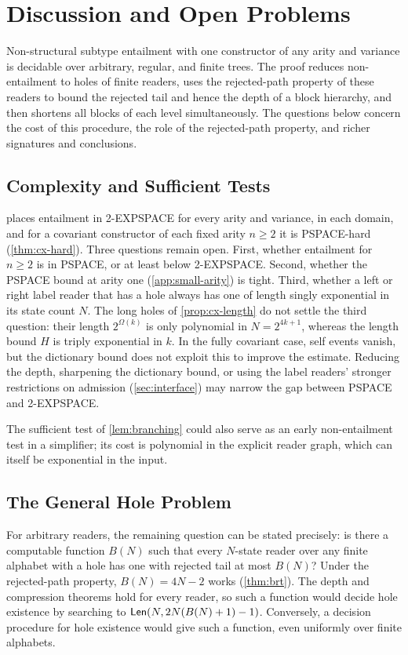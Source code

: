 \section{Discussion and Open Problems}
\label{sec:future}

Non-structural subtype entailment with one constructor of any arity and
variance is decidable over arbitrary, regular, and finite trees. The proof
reduces non-entailment to holes of finite readers, uses the rejected-path
property of these readers to bound the rejected tail and hence the depth of
a block hierarchy, and then shortens all blocks of each level
simultaneously. The questions below concern the cost of this procedure, the
role of the rejected-path property, and richer signatures and conclusions.

\subsection{Complexity and Sufficient Tests}
 places entailment in 2-EXPSPACE for every arity and
variance, in each domain, and for a covariant constructor of each fixed arity
$n\ge2$ it is PSPACE-hard (\cref{thm:cx-hard}). Three questions remain open.
First, whether entailment for $n\ge2$ is in PSPACE, or at least below
2-EXPSPACE. Second, whether the PSPACE bound at arity one
(\cref{app:small-arity}) is tight. Third, whether a left or right label
reader that has a hole always has one of length singly exponential in its
state count $N$. The long holes of \cref{prop:cx-length} do not settle the
third question: their length $2^{\Omega(k)}$ is only polynomial in
$N=2^{4k+1}$, whereas the length bound $H$ is triply exponential in $k$.
In the fully covariant case, self events vanish, but the dictionary bound
does not exploit this to improve the estimate. Reducing the depth,
sharpening the dictionary bound, or using the label readers' stronger
restrictions on admission (\cref{sec:interface}) may narrow the gap between
PSPACE and 2-EXPSPACE.

The sufficient test of \cref{lem:branching} could also serve as an early
non-entailment test in a simplifier; its cost is polynomial in the explicit
reader graph, which can itself be exponential in the input.

\subsection{The General Hole Problem}\label{sec:general-holes}
For arbitrary readers, the remaining question can be stated precisely:
is there a computable function $B(N)$ such that every $N$-state reader over
any finite alphabet with a hole has one with rejected tail at most $B(N)$?
Under the rejected-path property, $B(N)=4N-2$ works (\cref{thm:brt}).
The depth and compression theorems hold for every reader, so such a
function would decide hole existence by searching to
$\mathsf{Len}(N,2N(B(N)+1)-1)$. Conversely, a decision procedure for hole
existence would give such a function, even uniformly over finite alphabets.

